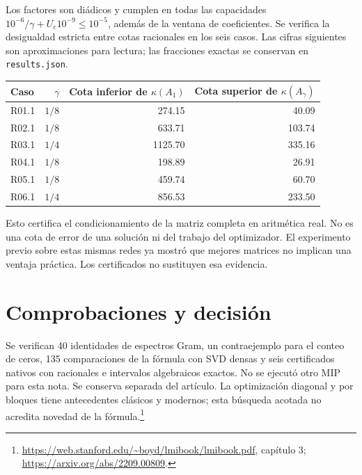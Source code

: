 \documentclass[10pt,a4paper]{article}
\begin{document}
Los factores son diádicos y cumplen en todas las capacidades
$10^{-6}/\gamma+U_e10^{-9}\le10^{-5}$, además de la ventana de coeficientes.
Se verifica la desigualdad estricta entre cotas racionales en los seis casos.
Las cifras siguientes son aproximaciones para lectura; las fracciones exactas
se conservan en \texttt{results.json}.
\begin{center}\small
\begin{tabular}{lrrr}\toprule
Caso&$\gamma$&Cota inferior de $\kappa(A_1)$&Cota superior de $\kappa(A_\gamma)$\\\midrule
R01.1&$1/8$&274.15&40.09\\
R02.1&$1/8$&633.71&103.74\\
R03.1&$1/4$&1125.70&335.16\\
R04.1&$1/8$&198.89&26.91\\
R05.1&$1/8$&459.74&60.70\\
R06.1&$1/4$&856.53&233.50\\\bottomrule
\end{tabular}
\end{center}
Esto certifica el condicionamiento de la matriz completa en aritmética real.
No es una cota de error de una solución ni del trabajo del optimizador. El
experimento previo sobre estas mismas redes ya mostró que mejores matrices no
implican una ventaja práctica. Los certificados no sustituyen esa evidencia.

\section{Comprobaciones y decisión}
Se verifican 40 identidades de espectros Gram, un contraejemplo para el conteo de
ceros, 135 comparaciones de la fórmula con SVD densas y seis certificados nativos
con racionales e intervalos algebraicos exactos. No se ejecutó otro MIP para esta nota.
Se conserva separada del artículo. La optimización diagonal y por bloques tiene
antecedentes clásicos y modernos; esta búsqueda acotada no acredita novedad de
la fórmula.\footnote{\url{https://web.stanford.edu/~boyd/lmibook/lmibook.pdf}, capítulo 3;
\url{https://arxiv.org/abs/2209.00809}.}
\end{document}
